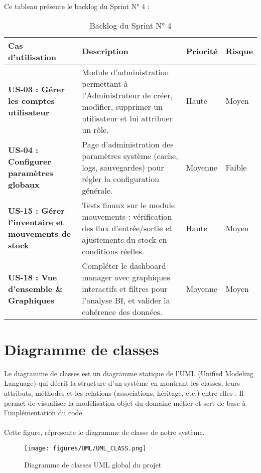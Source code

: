 \documentclass[12pt,a4paper]{report}
\renewcommand{\arraystretch}{1.5}
\begin{document}
Ce tableau présente le backlog du Sprint N° 4 :\\

\begin{table}[H]
  \centering
  \renewcommand{\arraystretch}{2}
  \begin{tabular}{|
      >{\bfseries\centering\arraybackslash}m{} %
      |>{\raggedright\arraybackslash}m{}       %
      |>{\centering\arraybackslash}m{}         %
      |>{\centering\arraybackslash}m{}         %
    |}
    \hline
    \rowcolor{lightblue!70}
    Cas d’utilisation & Description & Priorité & Risque \\
    \hline
    US-03 : Gérer les comptes utilisateur & Module d’administration permettant à l’Administrateur de créer, modifier, supprimer un utilisateur et lui attribuer un rôle. & Haute & Moyen \\
    \hline
    US-04 : Configurer paramètres globaux & Page d’administration des paramètres système (cache, logs, sauvegardes) pour régler la configuration générale. & Moyenne & Faible \\
    \hline
    US-15 : Gérer l’inventaire et mouvements de stock & Tests finaux sur le module mouvements : vérification des flux d’entrée/sortie et ajustements du stock en conditions réelles. & Haute & Moyen \\
    \hline
    US-18 : Vue d’ensemble \& Graphiques & Compléter le dashboard manager avec graphiques interactifs et filtres pour l’analyse BI, et valider la cohérence des données. & Moyenne & Moyen \\
    \hline
  \end{tabular}
  \caption{Backlog du Sprint N° 4}
  \label{tab:backlog_sprint4}
\end{table}


\cleardoublepage

\section{Diagramme de classes}

Le diagramme de classes est un diagramme statique de l’UML (Unified Modeling Language) qui décrit la structure d’un système en montrant les classes, leurs attributs, méthodes et les relations (associations, héritage, etc.) entre elles \cite{Fowler2003}. Il permet de visualiser la modélisation objet du domaine métier et sert de base à l’implémentation du code.
\\ \\
Cette figure, répresente le diagramme de classe de notre système.\\
\begin{figure}[H]
  \centering
  \texttt{[image: figures/UML/UML\_CLASS.png]}
  \caption{Diagramme de classes UML global du projet}
  \label{fig:class_diagram}
\end{figure}
\end{document}
